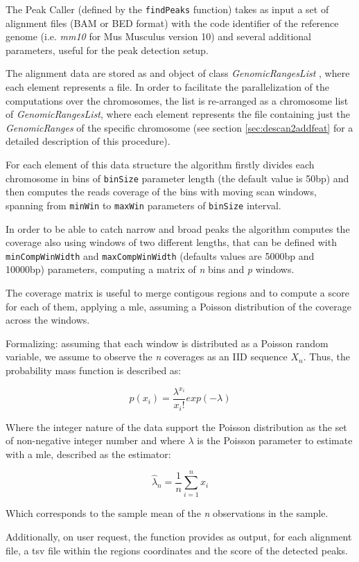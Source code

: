 The Peak Caller (defined by the \lstinline!findPeaks! function) takes as input a set of alignment files (BAM \cite{Li2009} or BED format) with the code identifier of the reference genome (i.e. \textit{mm10} for Mus Musculus version 10) and several additional parameters, useful for the peak detection setup.

The alignment data are stored as and object of class \textit{GenomicRangesList} \cite{Lawrence2013}, where each element represents a file. 
In order to facilitate the parallelization of the computations over the chromosomes, the list is re-arranged as a chromosome list of \textit{GenomicRangesList}, where each element represents the file containing just the \textit{GenomicRanges} of the specific chromosome (see section \ref{sec:descan2addfeat} for a detailed description of this procedure).

For each element of this data structure the algorithm firstly divides each chromosome in bins of \lstinline!binSize! parameter length (the default value is 50bp) and then computes the reads coverage of the bins with moving scan windows, spanning from \lstinline!minWin! to \lstinline!maxWin! parameters of \lstinline!binSize! interval.

In order to be able to catch narrow and broad peaks the algorithm computes the coverage also using windows of two different lengths, that can be defined with \lstinline!minCompWinWidth! and \lstinline!maxCompWinWidth! (defaults values are 5000bp and 10000bp) parameters, computing a matrix of \textit{n} bins and \textit{p} windows.

The coverage matrix is useful to merge contigous regions and to compute a score for each of them, applying a \gls{mle}, assuming a Poisson distribution of the coverage across the windows.

Formalizing: assuming that each window is distributed as a Poisson random variable, we assume to observe the \textit{n} coverages as an IID sequence $X_n$. Thus, the probability mass function is described as:

\[ p(x_i) = \frac{\lambda^{x_i}}{{x_i!}} exp(-\lambda)\]

Where the integer nature of the data support the Poisson distribution as the set of non-negative integer number and where $\lambda$ is the Poisson parameter to estimate with a \gls{mle}, described as the estimator:

\[\hat{\lambda}_n=\frac{1}{n}\sum_{i=1}^{n}x_i\]

Which corresponds to the sample mean of the \textit{n} observations in the sample.



Additionally, on user request, the function provides as output, for each alignment file, a \gls{tsv} file within the regions coordinates and the score of the detected peaks.


